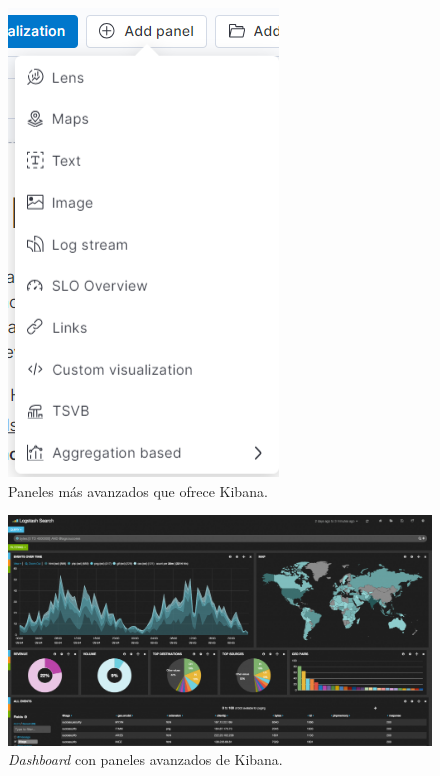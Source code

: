 \begin{figure}
    \centering
    \includegraphics[width=1\linewidth]{img/kibana17.png}
    \caption{Paneles más avanzados que ofrece Kibana.}
    \label{fig:kibana17}
\end{figure}

\begin{figure}
    \centering
    \includegraphics[width=1\linewidth]{img/kibana18.png}
    \caption{\textit{Dashboard} con paneles avanzados de Kibana.}
    \label{fig:kibana18}
\end{figure}

